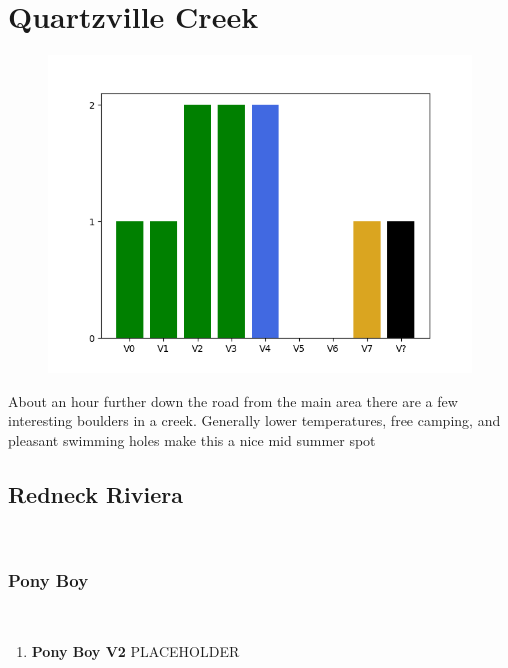 \chapter{Quartzville Creek}\label{a:Quartzville Creek}
\lhead{\textcolor{\chapterColor}{\rule[-2pt]{\textwidth}{15pt}}}
\begin{figure}[h]
  \centering
    \includegraphics[width=\linewidth]{./maps/plots/Quartzville Creek.png}
\end{figure}
About an hour further down the road from the main area there are a few interesting boulders in a creek. Generally lower temperatures, free camping, and pleasant swimming holes make this a nice mid summer spot

\section{Redneck Riviera}\label{sa:Redneck Riviera}
\

\subsection*{Pony Boy}\label{bf:Pony Boy}
\

\begin{enumerate}[]
	\item\label{rt:Pony Boy} \colorbox{green!20}{\textbf{Pony Boy V2  } }
	\newline PLACEHOLDER\
\end{enumerate}
